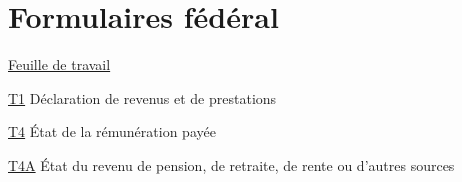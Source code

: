 \chapter*{Formulaires fédéral}

\href{https://www.canada.ca/fr/agence-revenu/services/formulaires-publications/trousses-impot-toutes-annees-imposition/trousse-generale-impot-prestations/5000-d1.html}{Feuille de travail}

\href{https://www.canada.ca/fr/agence-revenu/services/formulaires-publications/trousses-impot-toutes-annees-imposition/trousse-generale-impot-prestations/quebec/5005-r.html}{T1}
Déclaration de revenus et de prestations

\href{https://www.canada.ca/fr/agence-revenu/services/formulaires-publications/formulaires/t4.html}{T4}
État de la rémunération payée

\href{https://www.canada.ca/fr/agence-revenu/services/formulaires-publications/formulaires/t4a.html}{T4A}
État du revenu de pension, de retraite, de rente ou d'autres sources